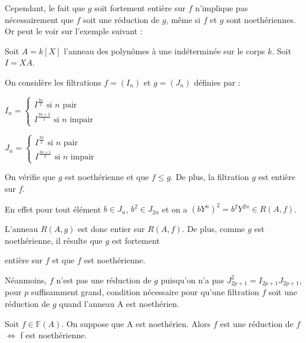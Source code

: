 \begin{maremarque}
	Cependant, le fait que $g$ soit fortement entière sur $f$ n'implique pas
	nécessairement que $f$ soit une réduction de $g$, m\^{e}me si $f$ et 
	$g$ sont noethériennes. Or peut le voir sur l'exemple suivant : 
	
	Soit $A=k[X]$ l'anneau des polynômes à une indéterminée sur le
	corps $k$. Soit $I=XA$. 
	
	On considère les filtrations $f=(I_{n})$ et $g=(J_{n})$ définies par
	:
	
	$I_{n}=\left\{ 
	\begin{array}{c}
		I^{\frac{3n}{2}}\text{ si }n\text{ pair} \\ 
		I^{\frac{3n+3}{2}}\text{ si }n\text{ impair}%
	\end{array}%
	\right. $
	
	$J_{n}=\left\{ 
	\begin{array}{c}
		I^{\frac{3n}{2}}\text{ si }n\text{ pair} \\ 
		I^{\frac{3n+1}{2}}\text{ si }n\text{ impair}
	\end{array}
	\right. $
	
	On vérifie que $g$ est noethérienne et que $f\leq g$. De plus, la
	filtration $g$ est entière sur $f$. 
	
	En effet pour tout élément $b\in J_{n}$, $b^{2}\in J_{2n}$ et on a $(bY^{n})^{2}=b^{2}Y^{2n}\in R(A,f)$. 
	
	L'anneau $R(A,g)$ est donc entier sur $R(A,f)$. De plus, comme $g$ est noethérienne, il résulte que $g$ est fortement
	
	entière sur $f$ et que $f$ est noethérienne. 
	
	Néanmoins, $f$ n'est pas une réduction de $g$ puisqu'on n'a pas $J_{2p+1}^{2}=I_{2p+1}J_{2p+1}$, pour $p$ suffisamment grand, condition nécessaire pour qu'une filtration $f$ soit une réduction de $g$ quand
	l'anneau A est noethérien. 
\end{maremarque}
\begin{maremarque}
	Soit $f \in \mathbb{F}(A)$. On suppose que A est noethérien. Alors $f$ est une réduction de $f$ $\Longleftrightarrow$ f est noethérienne.
\end{maremarque}
